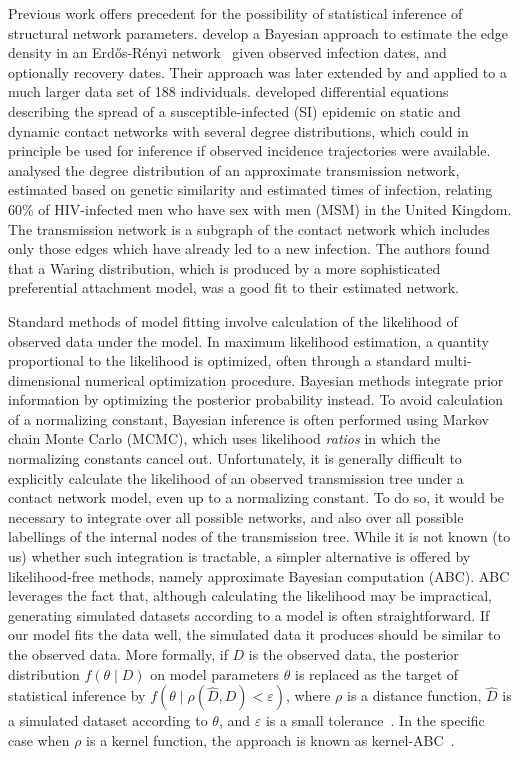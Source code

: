 \documentclass[nogrid]{MBE}
\begin{document}
Previous work offers precedent for the possibility of statistical inference of
structural network parameters. \citet{britton2002bayesian} develop a Bayesian
approach to estimate the edge density in an Erd\H{o}s-R\'enyi
network~\citep{erdos1960evolution} given observed infection dates, and
optionally recovery dates. Their approach was later extended by
\citet{groendyke2011bayesian} and applied to a much larger data set of 188
individuals. \citet{volz2007susceptible, volz2008sir} developed differential
equations describing the spread of a susceptible-infected (SI) epidemic on
static and dynamic contact networks with several degree distributions, which
could in principle be used for inference if observed incidence trajectories
were available. \citet{brown2011transmission} analysed the degree distribution
of an approximate transmission network, estimated based on genetic similarity
and estimated times of infection, relating 60\% of HIV-infected men who have
sex with men (MSM) in the United Kingdom. The transmission network is a
subgraph of the contact network which includes only those edges which have
already led to a new infection. The authors found that a Waring distribution,
which is produced by a more sophisticated preferential attachment model, was a
good fit to their estimated network. 

Standard methods of model fitting involve calculation of the likelihood of
observed data under the model. In maximum likelihood estimation, a quantity
proportional to the likelihood is optimized, often through a standard
multi-dimensional numerical optimization procedure. Bayesian methods integrate
prior information by optimizing the posterior probability instead. To avoid
calculation of a normalizing constant, Bayesian inference is often performed
using Markov chain Monte Carlo (MCMC), which uses likelihood \emph{ratios} in
which the normalizing constants cancel out. Unfortunately, it is generally
difficult to explicitly calculate the likelihood of an observed transmission
tree under a contact network model, even up to a normalizing constant. To do
so, it would be necessary to integrate over all possible networks, and also
over all possible labellings of the internal nodes of the transmission tree.
While it is not known (to us) whether such integration is tractable, a simpler
alternative is offered by likelihood-free methods, namely approximate Bayesian
computation (ABC). ABC leverages the fact that, although calculating the
likelihood may be impractical, generating simulated datasets according to a
model is often straightforward. If our model fits the data well, the simulated
data it produces should be similar to the observed data. More formally, if $D$
is the observed data, the posterior distribution $f(\theta \mid D)$ on model
parameters $\theta$ is replaced as the target of statistical inference by
$f(\theta \mid \rho(\hat{D}, D) < \varepsilon)$, where $\rho$ is a distance
function, $\hat{D}$ is a simulated dataset according to $\theta$, and
$\varepsilon$ is a small tolerance~\citep{sunnaaker2013approximate}. In the
specific case when $\rho$ is a kernel function, the approach is known as
kernel-ABC~\citep{nakagome2013kernel, poon2015phylodynamic}.
\end{document}
